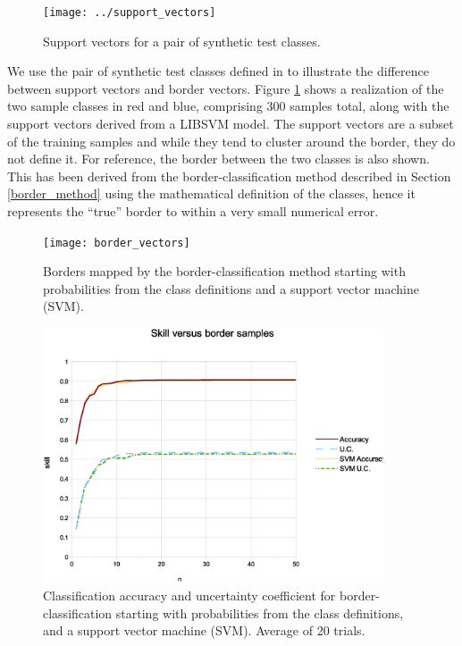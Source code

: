 \label{example}

\begin{figure}
\texttt{[image: ../support\_vectors]}
\caption{Support vectors for a pair of synthetic test classes.}\label{sample_sv}
\end{figure}

We use the pair of synthetic test classes defined in \citet{Mills2011} to 
illustrate the difference between support vectors and border vectors.
Figure \ref{sample_sv} shows a realization of the two sample classes 
in red and blue, comprising 300 samples total, along
with the support vectors derived from a LIBSVM model.
The support vectors are a subset of the training samples and while they
tend to cluster around the border, they do not define it.
For reference, the border between the two classes is also shown.
This has been derived from the border-classification method described in 
Section \ref{border_method} using the mathematical definition of the classes,
hence it represents the ``true'' border to within a very small numerical error.

\begin{figure}
\texttt{[image: border\_vectors]}
\caption{Borders mapped by the border-classification method starting with probabilities from the class definitions and a support vector machine (SVM).}
\label{border_vectors}
\end{figure}

\begin{figure}
\includegraphics[width=0.9\textwidth]{skill_vs_nb}
\caption{Classification accuracy and uncertainty coefficient for border-classification starting with probabilities from the class definitions, and a support vector machine (SVM). Average of 20 trials.}
\label{skill_v_nb}
\end{figure}

